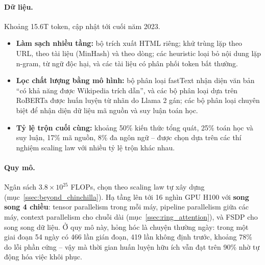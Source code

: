 \paragraph{Dữ liệu.} Khoảng 15.6T token, cập nhật tới cuối năm 2023.
\begin{itemize}
	\item \textbf{Làm sạch nhiều tầng:} bộ trích xuất HTML riêng; khử trùng lặp theo URL, theo tài liệu (MinHash) và theo dòng; các heuristic loại bỏ nội dung lặp n-gram, từ ngữ độc hại, và các tài liệu có phân phối token bất thường.
	\item \textbf{Lọc chất lượng bằng mô hình:} bộ phân loại fastText nhận diện văn bản “có khả năng được Wikipedia trích dẫn”, và các bộ phân loại dựa trên RoBERTa được huấn luyện từ nhãn do Llama 2 gán; các bộ phân loại chuyên biệt để nhận diện dữ liệu mã nguồn và suy luận toán học.
	\item \textbf{Tỷ lệ trộn cuối cùng:} khoảng 50\% kiến thức tổng quát, 25\% toán học và suy luận, 17\% mã nguồn, 8\% đa ngôn ngữ -- được chọn dựa trên các thí nghiệm scaling law với nhiều tỷ lệ trộn khác nhau.
\end{itemize}

\paragraph{Quy mô.} Ngân sách $3.8 \times 10^{25}$ FLOPs, chọn theo scaling law tự xây dựng (mục~\ref{ssec:beyond_chinchilla}). Hạ tầng lên tới 16 nghìn GPU H100 với \textbf{song song 4 chiều}: tensor parallelism trong mỗi máy, pipeline parallelism giữa các máy, context parallelism cho chuỗi dài (mục~\ref{ssec:ring_attention}), và FSDP cho song song dữ liệu. Ở quy mô này, hỏng hóc là chuyện thường ngày: trong một giai đoạn 54 ngày có 466 lần gián đoạn, 419 lần không định trước, khoảng 78\% do lỗi phần cứng -- vậy mà thời gian huấn luyện hữu ích vẫn đạt trên 90\% nhờ tự động hóa việc khôi phục.

